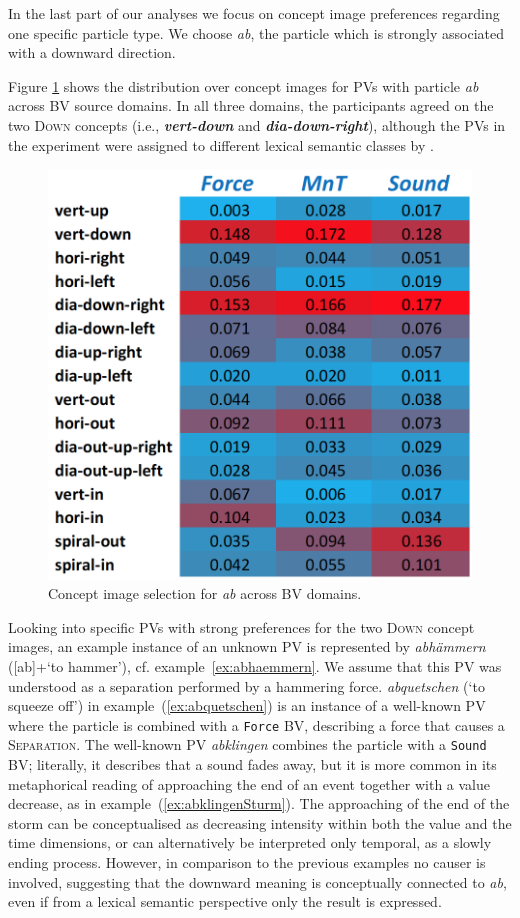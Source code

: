 \documentclass[output=paper]{langsci/langscibook}
\newcommand{\textci}[1]{\textit{\textbf{#1}}}
\begin{document}
In the last part of our analyses we focus on concept image preferences
regarding one specific particle type. We choose \textit{ab}, the
particle which is strongly associated with a downward direction.

Figure \ref{fig:particle-prop-domain-ab} shows the distribution over
concept images for PVs with particle \textit{ab} across BV source
domains. In all three domains, the participants agreed on the two
\textsc{Down} concepts (i.e., \textci{vert-down} and
\textci{dia-down-right}), although the PVs in the experiment were
assigned to different lexical semantic classes by \cite{Kliche:11}.

\begin{figure}[htbp]
  \caption{Concept image selection for \textit{ab} across BV domains.}
  \label{fig:particle-prop-domain-ab}
  \includegraphics[width=0.55\linewidth]{figures/dataset_particles_domains_ab}
\end{figure}

Looking into specific PVs with strong preferences for the two
\textsc{Down} concept images, an example instance of an unknown PV is represented
by \textit{abhämmern} ([ab]+`to hammer'),
cf. example~\ref{ex:abhaemmern}. We assume that this PV was understood
as a separation performed by a hammering force. \textit{abquetschen}
(`to squeeze off') in example~(\ref{ex:abquetschen}) is an instance of
a well-known PV where the particle is combined with a \texttt{Force}
BV, describing a force that causes a \textsc{Separation}. The
well-known PV \textit{abklingen} combines the particle with a
\texttt{Sound} BV; literally, it describes that a sound fades away,
but it is more common in its metaphorical reading of approaching the
end of an event together with a value decrease, as in
example~(\ref{ex:abklingenSturm}). The approaching of the end of the
storm can be conceptualised as decreasing intensity within both the
value and the time dimensions, or can alternatively be interpreted
only temporal, as a slowly ending process. However, in comparison to
the previous examples no causer is involved, suggesting that the
downward meaning is conceptually connected to \textit{ab}, even if
from a lexical semantic perspective only the result is expressed.
\end{document}
